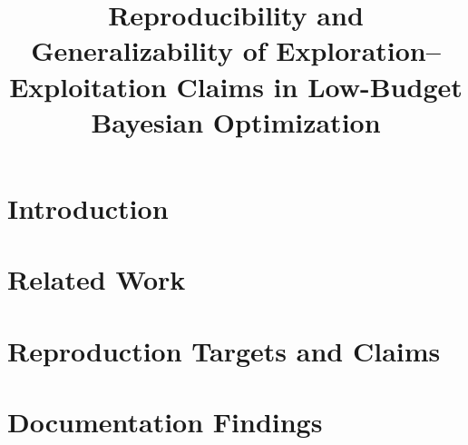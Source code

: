\documentclass{article}
\title{Reproducibility and Generalizability of Exploration--Exploitation Claims in Low-Budget Bayesian Optimization}
\author{}
\date{}
\begin{document}
\maketitle

\begin{abstract}
\end{abstract}

\section{Introduction}

\section{Related Work}

\section{Reproduction Targets and Claims}

\section{Documentation Findings}
\end{document}
